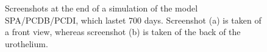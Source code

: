 \begin{figure}[ht]
\begin{center}
\end{center}
\begin{center}
\end{center}
\caption[Simulated urothel with the model SPA/PCDB/PCDI at day 700]{\label{img:720daysScreenshotSPA/BCPD/IPCD}Screenshots at the end of a simulation of the model SPA/PCDB/PCDI, which lastet 700 days. Screenshot (a) is taken of a front view, whereas screenshot (b) is taken of the back of the urothelium.}

\end{figure}




